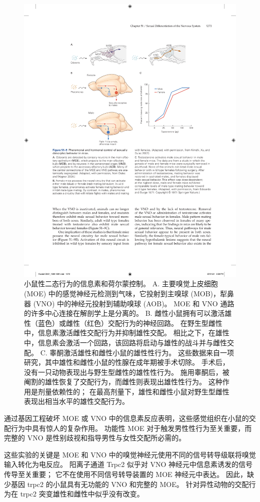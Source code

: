 \begin{figure}[htbp]
	\centering
	\includegraphics[width=0.8\linewidth]{chap51/fig_51_9}
	\caption{小鼠性二态行为的信息素和荷尔蒙控制。
		A. 主要嗅觉上皮细胞 (MOE) 中的感觉神经元检测到气味，它投射到主嗅球 (MOB)，犁鼻器 (VNO) 中的神经元投射到辅助嗅球 (AOB)。
		MOE 和 VNO 通路的许多中心连接在解剖学上是分离的\cite{dulac2006genetic}。
		B. 雌性小鼠拥有可以激活雄性（蓝色）或雌性（红色）交配行为的神经回路。
		在野生型雌性中，信息素激活雌性交配行为并抑制雄性交配。
		相比之下，在雄性中，信息素会激活一个回路，该回路将启动与雄性的战斗并与雌性交配\cite{kimchi2007functional}。
		C. 睾酮激活雄性和雌性小鼠的雄性性行为。
		这些数据来自一项研究，其中雄性和雌性小鼠的性腺在成年期被手术切除。
		手术后，没有一只动物表现出与野生型雌性的雄性性行为。
		施用睾酮后，被阉割的雄性恢复了交配行为，而雌性则表现出雄性性行为。
		这种作用是剂量依赖性的；
		在最高剂量下，雄性和雌性小鼠对野生型雌性表现出相当水平的雄性交配行为\cite{edwards1971early}。 }
	\label{fig:51_9}
\end{figure}


通过基因工程破坏 MOE 或 VNO 中的信息素反应表明，这些感觉组织在小鼠的交配行为中具有惊人的复杂作用。
功能性 MOE 对于触发男性性行为至关重要，而完整的 VNO 是性别歧视和指导男性与女性交配所必需的。


这些实验的关键是 MOE 和 VNO 中的嗅觉神经元使用不同的信号转导级联将嗅觉输入转化为电反应。
阳离子通道 Trpc2 似乎对 VNO 神经元中信息素诱发的信号传导至关重要；
它不在使用不同信号转导装置的 MOE 神经元中表达。
因此，缺少基因 trpc2 的小鼠具有无功能的 VNO 和完整的 MOE。
针对异性动物的交配行为在 trpc2 突变雄性和雌性中似乎没有改变。


